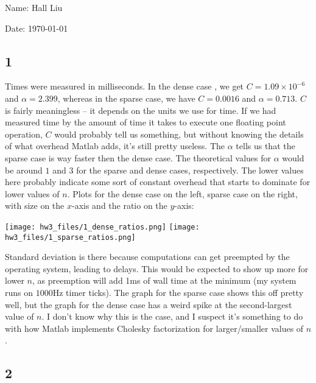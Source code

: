 \documentclass{article}
\begin{document}
Name: Hall Liu

Date: \today 

\subsection*{1}
Times were measured in milliseconds. In the dense case , we get $C=1.09\times10^{-6}$ and $\alpha=2.399$, whereas in the sparse case, we have $C=0.0016$ and $\alpha=0.713$. $C$ is fairly meaningless -- it depends on the units we use for time. If we had measured time by the amount of time it takes to execute one floating point operation, $C$ would probably tell us something, but without knowing the details of what overhead Matlab adds, it's still pretty useless. The $\alpha$ tells us that the sparse case is way faster then the dense case. The theoretical values for $\alpha$ would be around $1$ and $3$ for the sparse and dense cases, respectively. The lower values here probably indicate some sort of constant overhead that starts to dominate for lower values of $n$.
Plots for the dense case on the left, sparse case on the right, with size on the $x$-axis and the ratio on the $y$-axis:

\texttt{[image: hw3\_files/1\_dense\_ratios.png]}
\texttt{[image: hw3\_files/1\_sparse\_ratios.png]}

Standard deviation is there because computations can get preempted by the operating system, leading to delays. This would be expected to show up more for lower $n$, as preemption will add 1ms of wall time at the minimum (my system runs on $1000$Hz timer ticks). The graph for the sparse case shows this off pretty well, but the graph for the dense case has a weird spike at the second-largest value of $n$. I don't know why this is the case, and I suspect it's something to do with how Matlab implements Cholesky factorization for larger/smaller values of $n$.
\subsection*{2}
\end{document}
